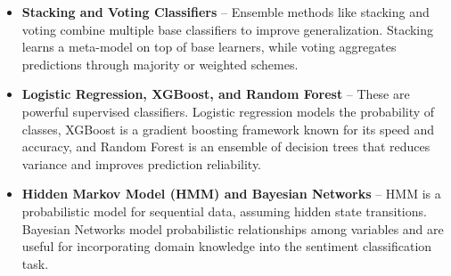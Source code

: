\begin{itemize}
    \item \textbf{Stacking and Voting Classifiers} – Ensemble methods like stacking and voting combine multiple base classifiers to improve generalization. Stacking learns a meta-model on top of base learners, while voting aggregates predictions through majority or weighted schemes.
    
    \item \textbf{Logistic Regression, XGBoost, and Random Forest} – These are powerful supervised classifiers. Logistic regression models the probability of classes, XGBoost is a gradient boosting framework known for its speed and accuracy, and Random Forest is an ensemble of decision trees that reduces variance and improves prediction reliability.
    
    \item \textbf{Hidden Markov Model (HMM) and Bayesian Networks} – HMM is a probabilistic model for sequential data, assuming hidden state transitions. Bayesian Networks model probabilistic relationships among variables and are useful for incorporating domain knowledge into the sentiment classification task.
\end{itemize}



